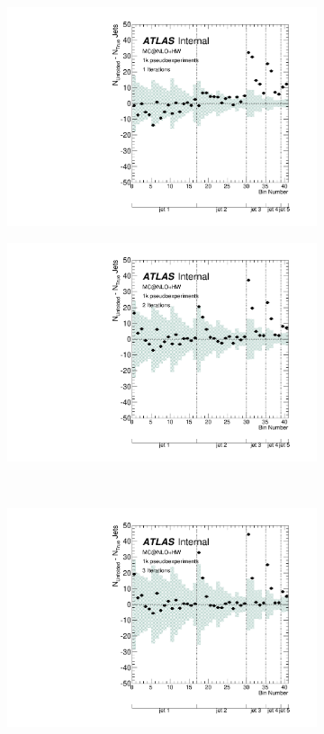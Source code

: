 \clearpage
\begin{figure}
\begin{subfigure}[]{0.5\textwidth}
\includegraphics[width=\textwidth]{fig/Stress/105200atlfast/Bias1Iterations.pdf}
\end{subfigure}
\begin{subfigure}[]{0.5\textwidth}
\includegraphics[width=\textwidth]{fig/Stress/105200atlfast/Bias2Iterations.pdf}
\end{subfigure}
\\
\begin{subfigure}[]{0.5\textwidth}
\includegraphics[width=\textwidth]{fig/Stress/105200atlfast/Bias3Iterations.pdf}

\end{subfigure}
\end{figure}
